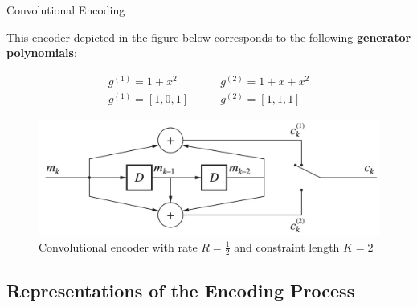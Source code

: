 \documentclass{beamer}
\newcommand{\<}				{\langle}
\renewcommand{\>}      		{\rangle}
\begin{document}

\begin{frame}{Convolutional Encoding}

This encoder depicted in the figure below corresponds to the following \textbf{generator polynomials}:

\begin{equation}
\begin{aligned}
g^{(1)}=1+x^2 \quad \quad & g^{(2)}=1+x+x^2  \\
g^{(1)}=[1, 0, 1] \quad \quad & g^{(2)}=[1, 1, 1]
\end{aligned}
\end{equation}


\begin{figure}[h]
\centering
\includegraphics[scale=0.15]{conv_code.png}
\caption{Convolutional encoder with rate $R=\frac{1}{2}$ and constraint length $K=2$}
\end{figure}

\end{frame}

\subsection{Representations of the Encoding Process} 
\end{document}
